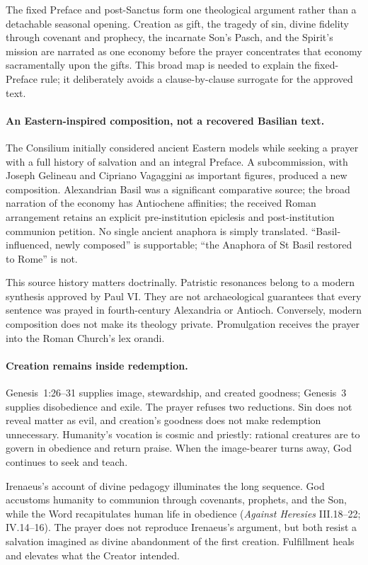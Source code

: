 The fixed Preface and post-Sanctus form one theological argument rather than a detachable seasonal opening. Creation as gift, the tragedy of sin, divine fidelity through covenant and prophecy, the incarnate Son's Pasch, and the Spirit's mission are narrated as one economy before the prayer concentrates that economy sacramentally upon the gifts. This broad map is needed to explain the fixed-Preface rule; it deliberately avoids a clause-by-clause surrogate for the approved text.

\paragraph{An Eastern-inspired composition, not a recovered Basilian text.}
The Consilium initially considered ancient Eastern models while seeking a prayer with a full history of salvation and an integral Preface. A subcommission, with Joseph Gelineau and Cipriano Vagaggini as important figures, produced a new composition. Alexandrian Basil was a significant comparative source; the broad narration of the economy has Antiochene affinities; the received Roman arrangement retains an explicit pre-institution epiclesis and post-institution communion petition. No single ancient anaphora is simply translated. ``Basil-influenced, newly composed'' is supportable; ``the Anaphora of St Basil restored to Rome'' is not.

This source history matters doctrinally. Patristic resonances belong to a modern synthesis approved by Paul VI\@. They are not archaeological guarantees that every sentence was prayed in fourth-century Alexandria or Antioch. Conversely, modern composition does not make its theology private. Promulgation receives the prayer into the Roman Church's lex orandi.

\paragraph{Creation remains inside redemption.}
Genesis~1:26--31 supplies image, stewardship, and created goodness; Genesis~3 supplies disobedience and exile. The prayer refuses two reductions. Sin does not reveal matter as evil, and creation's goodness does not make redemption unnecessary. Humanity's vocation is cosmic and priestly: rational creatures are to govern in obedience and return praise. When the image-bearer turns away, God continues to seek and teach.

Irenaeus's account of divine pedagogy illuminates the long sequence. God accustoms humanity to communion through covenants, prophets, and the Son, while the Word recapitulates human life in obedience (\emph{Against Heresies} III.18--22; IV.14--16). The prayer does not reproduce Irenaeus's argument, but both resist a salvation imagined as divine abandonment of the first creation. Fulfillment heals and elevates what the Creator intended.

